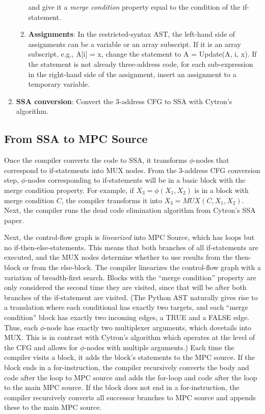 \begin{enumerate}
\begin{enumerate}
                and give it a \emph{merge condition} property equal to the condition of the if-statement.
          \item
                \textbf{Assignments}:
                In the restricted-syntax AST,
                the left-hand side of assignments
                can be a variable or an array subscript.
                If it is an array subscript, e.g., {\sf A[i] = x},
                change the statement to {\sf A = Update(A, i, x)}.
                If the statement is not already three-address code,
                for each sub-expression in the right-hand side of the assignment,
                insert an assignment to a temporary variable.
        \end{enumerate}
  \item
        \textbf{SSA conversion}:
        Convert the 3-address CFG to SSA with Cytron's algorithm.
\end{enumerate}

\subsection{From SSA to MPC Source} %

Once the compiler converts the code to SSA,
it transforms $\phi$-nodes that correspond to if-statements into MUX nodes.
From the 3-address CFG conversion step,
$\phi$-nodes corresponding to if-statements will be in a basic block
with the merge condition property.
For example, if $X_3 = \phi(X_1,X_2)$ is in a block with merge condition $C$,
the compiler transforms it into $X_3 = \mathit{MUX}(C, X_1, X_2)$.
Next, the compiler runs the dead code elimination algorithm from Cytron's SSA paper.

Next, the control-flow graph is \emph{linearized} into MPC Source,
which has loops but no if-then-else-statements.
This means that both branches of all if-statements are executed,
and the MUX nodes determine whether to use results from the then-block or from the else-block.
The compiler linearizes the control-flow graph with a variation of breadth-first search.
Blocks with the ``merge condition'' property are only considered
the second time they are visited,
since that will be after both branches of the if-statement are visited.
(The Python AST naturally gives rise to a translation where each conditional has exactly two targets,
and each ``merge condition'' block has exactly two incoming edges, a TRUE and a FALSE edge.
Thus, each $\phi$-node has exactly two multiplexer arguments, which dovetails into MUX.
This is in contrast with Cytron's algorithm which operates at the level of the CFG and allows for
$\phi$-nodes with multiple arguments.)
Each time the compiler visits a block,
it adds the block's statements to the MPC source.
If the block ends in a for-instruction,
the compiler recursively converts the body and code after the loop to MPC source
and adds the for-loop and code after the loop to the main MPC source.
If the block does not end in a for-instruction,
the compiler recursively converts all successor branches to MPC source and
appends these to the main MPC source.

